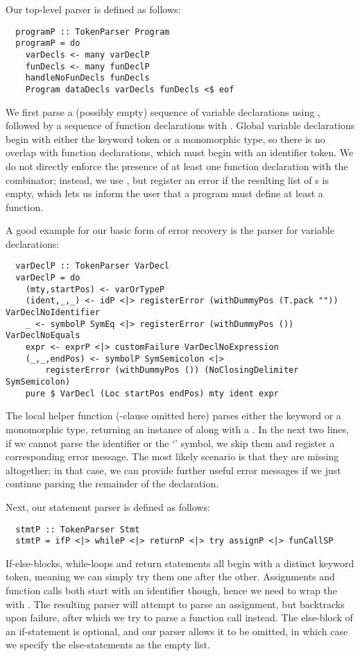 Our top-level parser is defined as follows:
\begin{verbatim}
  programP :: TokenParser Program
  programP = do
    varDecls <- many varDeclP
    funDecls <- many funDeclP
    handleNoFunDecls funDecls
    Program dataDecls varDecls funDecls <$ eof
\end{verbatim}
%
We first parse a (possibly empty) sequence of variable declarations using
, followed by a sequence of function declarations with
.
Global variable declarations begin with either the  keyword token or
a monomorphic type, so there is no overlap with function declarations, which
must begin with an identifier token.
We do not directly enforce the presence of at least one function declaration
with the  combinator; instead, we use , but register an
error if the resulting list of s is empty, which lets us inform
the user that a program must define at least a  function.

A good example for our basic form of error recovery is the parser for variable
declarations:
\begin{verbatim}
  varDeclP :: TokenParser VarDecl
  varDeclP = do
    (mty,startPos) <- varOrTypeP
    (ident,_,_) <- idP <|> registerError (withDummyPos (T.pack "")) VarDeclNoIdentifier
    _ <- symbolP SymEq <|> registerError (withDummyPos ()) VarDeclNoEquals
    expr <- exprP <|> customFailure VarDeclNoExpression
    (_,_,endPos) <- symbolP SymSemicolon <|>
        registerError (withDummyPos ()) (NoClosingDelimiter SymSemicolon)
    pure $ VarDecl (Loc startPos endPos) mty ident expr
\end{verbatim}
%
The local  helper function (-clause omitted
here) parses either the  keyword or a monomorphic type, returning an
instance of  along with a .
In the next two lines, if we cannot parse the identifier or the `\spl{=}' symbol,
we skip them and register a corresponding error message. The most
likely scenario is that they are missing altogether; in that case, we can
provide further useful error messages if we just continue parsing the remainder
of the declaration.

Next, our statement parser is defined as follows:
\begin{verbatim}
  stmtP :: TokenParser Stmt
  stmtP = ifP <|> whileP <|> returnP <|> try assignP <|> funCallSP
\end{verbatim}
%
If-else-blocks, while-loops and return statements all begin with a distinct
keyword token, meaning we can simply try them one after the other.
Assignments and function calls both start with an identifier though, hence we
need to wrap the  with . The resulting parser will
attempt to parse an assignment, but backtracks upon failure, after which we try
to parse a function call instead.
The else-block of an if-statement is optional, and our parser allows it to be
omitted, in which case we specify the else-statements as the empty list.

